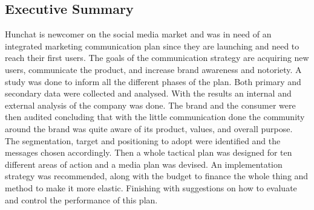 \documentclass[12pt]{article}
\begin{document}
\subsection{Executive Summary}
Hunchat is newcomer on the social media market and was in need of an integrated marketing communication plan since they are launching and need to reach their first users. The goals of the communication strategy are acquiring new users, communicate the product, and increase brand awareness and notoriety. A study was done to inform all the different phases of the plan. Both primary and secondary data were collected and analysed. With the results an internal and external analysis of the company was done. The brand and the consumer were then audited concluding that with the little communication done the community around the brand was quite aware of its product, values, and overall purpose. The segmentation, target and positioning to adopt were identified and the messages chosen accordingly. Then a whole tactical plan was designed for ten different areas of action and a media plan was devised. An implementation strategy was recommended, along with the budget to finance the whole thing and method to make it more elastic. Finishing with suggestions on how to evaluate and control the performance of this plan.
\end{document}
